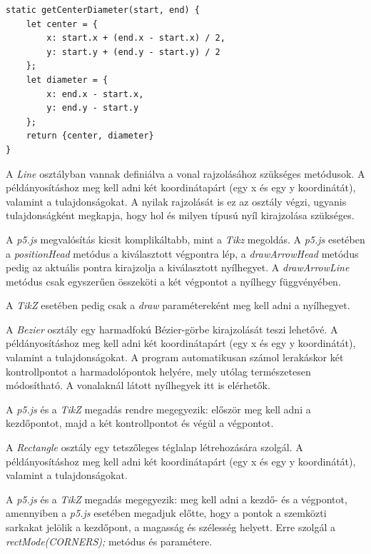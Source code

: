 \begin{lstlisting}[style=es6]
static getCenterDiameter(start, end) {
	let center = {
		x: start.x + (end.x - start.x) / 2,
		y: start.y + (end.y - start.y) / 2
	};
	let diameter = {
		x: end.x - start.x,
		y: end.y - start.y
	};
	return {center, diameter}
}
\end{lstlisting}


A \textit{Line} osztályban vannak definiálva a vonal rajzolásához szükséges metódusok. A példányosításhoz meg kell adni két koordinátapárt (egy x és egy y koordinátát), valamint a tulajdonságokat. A nyilak rajzolását is ez az osztály végzi, ugyanis tulajdonságként megkapja, hogy hol és milyen típusú nyíl kirajzolása szükséges. 

A \textit{p5.js} megvalósítás kicsit komplikáltabb, mint a \textit{Tikz} megoldás. A \textit{p5.js} esetében a \textit{positionHead} metódus a kiválasztott végpontra lép, a \textit{drawArrowHead} metódus pedig az aktuális pontra kirajzolja a kiválasztott nyílhegyet. A \textit{drawArrowLine} metódus csak egyszerűen összeköti a két végpontot a nyílhegy függvényében.

A \textit{TikZ} esetében pedig csak a \textit{draw} paramétereként meg kell adni a nyílhegyet.


A \textit{Bezier} osztály egy harmadfokú Bézier-görbe kirajzolását teszi lehetővé. A példányosításhoz meg kell adni két koordinátapárt (egy x és egy y koordinátát), valamint a tulajdonságokat. A program automatikusan számol lerakáskor két kontrollpontot a harmadolópontok helyére, mely utólag természetesen módosítható. A vonalaknál látott nyílhegyek itt is elérhetők.

A \textit{p5.js} és a \textit{TikZ} megadás rendre megegyezik: először meg kell adni a kezdőpontot, majd a két kontrollpontot és végül a végpontot.


A \textit{Rectangle} osztály egy tetszőleges téglalap létrehozására szolgál. A példányosításhoz meg kell adni két koordinátapárt (egy x és egy y koordinátát), valamint a tulajdonságokat. 

A \textit{p5.js} és a \textit{TikZ} megadás megegyezik: meg kell adni a kezdő- és a végpontot, amennyiben a \textit{p5.js} esetében megadjuk előtte, hogy a pontok a szemközti sarkakat jelölik a kezdőpont, a magasság és szélesség helyett. Erre szolgál a \textit{rectMode(CORNERS);} metódus és paramétere.

